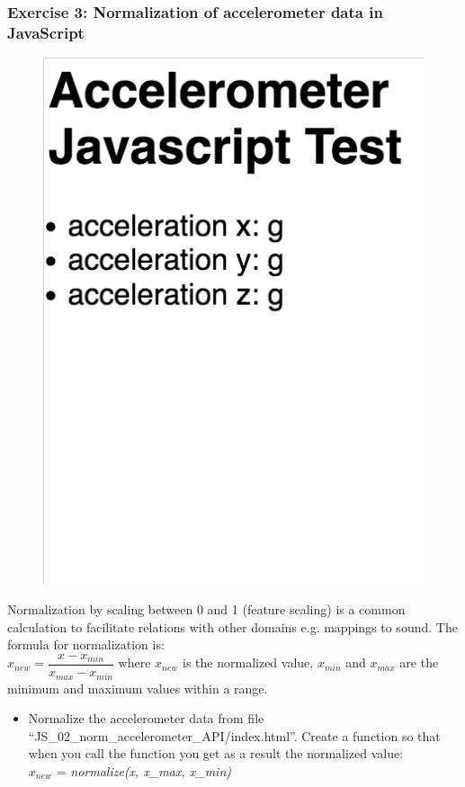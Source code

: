 \documentclass[screen, aspectratio=43]{beamer}
\begin{document}
%
\begin{frame}
  \frametitle{Exercise 3: Normalization of accelerometer data in JavaScript}
       \begin{figure}
	\includegraphics[scale=0.12]{img/js-accelerometer.png}
      \end{figure}
  {\scriptsize Normalization by scaling between 0 and 1 (feature scaling) is a common calculation to facilitate relations with other domains e.g. mappings to sound. The formula for normalization is:\\
  $x_{new} = \dfrac{x-x_{min}}{x_{max}-x_{min}}$
  where $x_{new}$ is the normalized value, $x_{min}$ and $x_{max}$ are the minimum and maximum values within a range. 
    \begin{itemize}
    	\item Normalize the accelerometer data from file ``JS\_02\_norm\_accelerometer\_API/index.html''. Create a function so that when you call the function you get as a result the normalized value: \\
	$x_{new}$ = \emph{normalize(x, x\_{max}, x\_{min})}
    \end{itemize}
    }
\end{frame}
\end{document}
